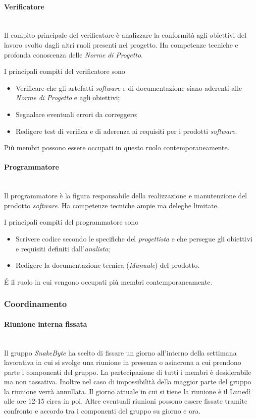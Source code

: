 \documentclass[10pt, letterpaper]{article}
\newcommand{\trisubsection}[1]{\paragraph{#1}\mbox{}\\}
\begin{document}
\label{sec:Verificatore}
\trisubsection{Verificatore}
Il compito principale del verificatore è analizzare la conformità agli obiettivi del lavoro svolto dagli altri ruoli presenti nel progetto. Ha competenze tecniche e profonda conoscenza delle \textit{Norme di Progetto}.

I principali compiti del verificatore sono
\begin{itemize}
    \item Verificare che gli artefatti \textit{software} e di documentazione siano aderenti alle \textit{Norme di Progetto} e agli obiettivi;
    \item Segnalare eventuali errori da correggere;
    \item Redigere test di verifica e di aderenza ai requisiti per i prodotti \textit{software}.
\end{itemize}
Più membri possono essere occupati in questo ruolo contemporaneamente.

\label{sec:Programmatore}
\trisubsection{Programmatore}
Il programmatore è la figura responsabile della realizzazione e manutenzione del prodotto \textit{software}. Ha competenze tecniche ampie ma deleghe limitate.

I principali compiti del programmatore sono
\begin{itemize}
    \item Scrivere codice secondo le specifiche del \textit{progettista} e che persegue gli obiettivi e requisiti definiti dall'\textit{analista};
    \item Redigere la documentazione tecnica (\textit{Manuale}) del prodotto.
\end{itemize}

\'E il ruolo in cui vengono occupati più membri contemporaneamente.


\subsubsection{Coordinamento}

\trisubsection{Riunione interna fissata}
Il gruppo \textit{SnakeByte} ha scelto di fissare un giorno all'interno della settimana lavorativa in cui si svolge una riunione in presenza o asincrona a cui prendono parte i componenti del gruppo. La partecipazione di tutti i membri è desiderabile ma non tassativa. Inoltre nel caso di impossibilità della maggior parte del gruppo la riunione verrà annullata.
Il giorno attuale in cui si tiene la riunione è il Lunedì alle ore 12-15 circa in poi.
Altre eventuali riunioni possono essere fissate tramite confronto e accordo tra i componenti del gruppo su giorno e ora.
\end{document}
